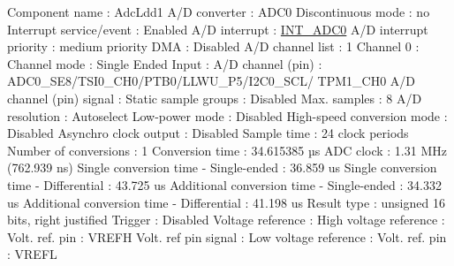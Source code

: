 \begin{DoxyCode}
            Component name                                 : AdcLdd1
            A/D converter                                  : ADC0
            Discontinuous mode                             : no
            Interrupt service/event                        : Enabled
              A/D interrupt                                : \hyperlink{group___interrupt__vector__numbers_gga5f3656e2a154b64aa378a2f3856c3a8dadc0bb741cef921ebacfbc9105c85097b}{INT\_ADC0}
              A/D interrupt priority                       : medium priority
            DMA                                            : Disabled
            A/D channel list                               : 1
              Channel 0                                    : 
                Channel mode                               : Single Ended
                  Input                                    : 
                    A/D channel (pin)                      : ADC0\_SE8/TSI0\_CH0/PTB0/LLWU\_P5/I2C0\_SCL/
      TPM1\_CH0
                    A/D channel (pin) signal               : 
            Static sample groups                           : Disabled
            Max. samples                                   : 8
            A/D resolution                                 : Autoselect
            Low-power mode                                 : Disabled
            High-speed conversion mode                     : Disabled
            Asynchro clock output                          : Disabled
            Sample time                                    : 24 clock periods
            Number of conversions                          : 1
            Conversion time                                : 34.615385 µs
            ADC clock                                      : 1.31 MHz (762.939 ns)
            Single conversion time - Single-ended          : 36.859 us
            Single conversion time - Differential          : 43.725 us
            Additional conversion time - Single-ended      : 34.332 us
            Additional conversion time - Differential      : 41.198 us
            Result type                                    : unsigned 16 bits, right justified
            Trigger                                        : Disabled
            Voltage reference                              : 
              High voltage reference                       : 
                Volt. ref. pin                             : VREFH
                Volt. ref pin signal                       : 
              Low voltage reference                        : 
                Volt. ref. pin                             : VREFL

\end{DoxyCode}
